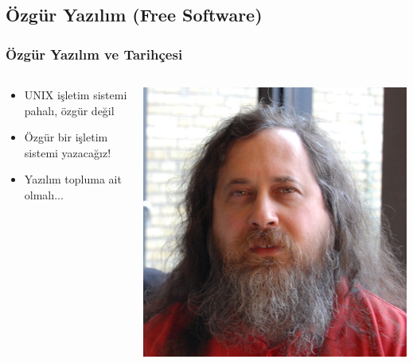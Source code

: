 \documentclass{beamer}
\begin{document}
	\subsection{Özgür Yazılım (Free Software)}
		\begin{frame}
			\frametitle{Özgür Yazılım ve Tarihçesi}
			\begin{columns}
			\begin{column}[l]{5cm}
				\begin{itemize}
				\item UNIX işletim sistemi pahalı, özgür değil
				\item Özgür bir işletim sistemi yazacağız!
				\item Yazılım topluma ait olmalı...
				\end{itemize}
			\end{column}
			\begin{column}[r]{5cm}
			\includegraphics{img/richard}
			\end{column}
			\end{columns}
			
		\end{frame}
		
\end{document}
